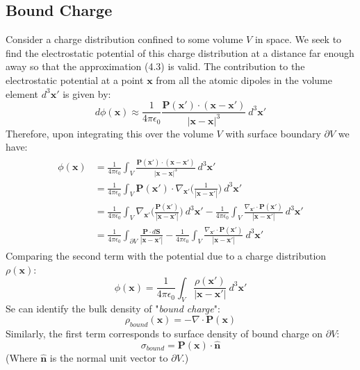 \documentclass[a4paper]{article}
\numberwithin{equation}{section}
\begin{document}
\subsection{Bound Charge}
Consider a charge distribution confined to some volume $V$ in space. We seek to find the electrostatic potential of this charge distribution at a distance far enough away so that the approximation (4.3) is valid. The contribution to the electrostatic potential at a point $\mathbf{x}$ from all the atomic dipoles in the volume element $d^3\mathbf{x}'$ is given by:
\begin{equation}
d\phi(\mathbf{x})\approx \frac{1}{4 \pi \epsilon_0} \frac{\mathbf{P}(\mathbf{x}')\cdot(\mathbf{x}-\mathbf{x}')}{|\mathbf{x}-\mathbf{x}|^3} \ d^3 \mathbf{x}' 
\end{equation}
Therefore, upon integrating this over the volume $V$ with surface boundary $\partial V$ we have:
\begin{align}
\begin{split}
\phi(\mathbf{x})&= \frac{1}{4\pi \epsilon_0} \int_V \frac{\mathbf{P}(\mathbf{x}')\cdot(\mathbf{x}-\mathbf{x}')}{|\mathbf{x}-\mathbf{x}|^3} \ d^3 \mathbf{x}' \\
&=\frac{1}{4 \pi \epsilon_0} \int_V \mathbf{P}(\mathbf{x}') \cdot \nabla_{\mathbf{x}'}\bigg(\frac{1}{|\mathbf{x}-\mathbf{x}'|} \bigg) \ d^3 \mathbf{x}' \\
&= \frac{1}{4 \pi \epsilon_0} \int_V \nabla_{\mathbf{x}'} \bigg(\frac{\mathbf{P}(\mathbf{x}')}{|\mathbf{x}-\mathbf{x}'|} \bigg) \ d^3 \mathbf{x}' - \frac{1}{4 \pi \epsilon_0} \int_V \frac{\nabla_{\mathbf{x}'} \cdot \mathbf{P}(\mathbf{x}')}{|\mathbf{x} - \mathbf{x}'|} \ d^3 \mathbf{x}' \\
&= \frac{1}{4 \pi \epsilon_0} \int_{\partial V} \frac{\mathbf{P} \cdot d\mathbf{S}}{|\mathbf{x}-\mathbf{x}'|} - \frac{1}{4 \pi \epsilon_0} \int_V \frac{\nabla_{\mathbf{x}'} \cdot \mathbf{P}(\mathbf{x}')}{|\mathbf{x} - \mathbf{x}'|} \ d^3 \mathbf{x}'
\end{split}
\end{align}
Comparing the second term with the potential due to a charge distribution $\rho(\mathbf{x})$:
\begin{equation}
\phi(\mathbf{x})=\frac{1}{4 \pi \epsilon_0} \int_V \frac{\rho(\mathbf{x}')}{|\mathbf{x}-\mathbf{x}'|} \ d^3 \mathbf{x}'
\end{equation}
Se can identify the bulk density of "\textit{bound charge}":
\begin{equation}
\rho_{bound}(\mathbf{x})= -\nabla \cdot \mathbf{P}(\mathbf{x})
\end{equation}
Similarly, the first term corresponds to surface density of bound charge on $\partial V$:
\begin{equation}
\sigma_{bound}=\mathbf{P}(\mathbf{x})\cdot \hat{\mathbf{n}}
\end{equation}
(Where $\hat{\mathbf{n}}$ is the normal unit vector to $\partial V$.)
\end{document}
